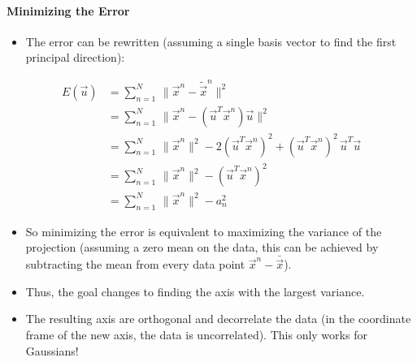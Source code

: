 		\paragraph{Minimizing the Error}
			\begin{itemize}
				\item The error can be rewritten (assuming a single basis vector to find the first principal direction):
			\end{itemize}
			\begin{align}
				E(\vec{u}) & = \sum_{n = 1}^{N} \, \lVert \vec{x}^n - \tilde{\vec{x}}^n \rVert^2                                                        \\
				           & = \sum_{n = 1}^{N} \, \lVert \vec{x}^n - (\vec{u}^T \vec{x}^n) \vec{u} \rVert^2                                            \\
				           & = \sum_{n = 1}^{N} \, \lVert \vec{x}^n \rVert^2 - 2 (\vec{u}^T \vec{x}^n)^2 + (\vec{u}^T \vec{x}^n)^2 \, \vec{u}^T \vec{u} \\
				           & = \sum_{n = 1}^{N} \, \lVert \vec{x}^n \rVert^2 - (\vec{u}^T \vec{x}^n)^2                                                  \\
				           & = \sum_{n = 1}^{N} \, \lVert \vec{x}^n \rVert^2 - a_n^2
			\end{align}
			\begin{itemize}
				\item So minimizing the error is equivalent to maximizing the variance of the projection (assuming a zero mean on the data, this can be achieved by subtracting the mean from every data point \( \vec{x}^n - \bar{\vec{x}} \)).
				\item Thus, the goal changes to finding the axis with the largest variance.
				\item The resulting axis are orthogonal and decorrelate the data (in the coordinate frame of the new axis, the data is uncorrelated). This only works for Gaussians!
			\end{itemize}

